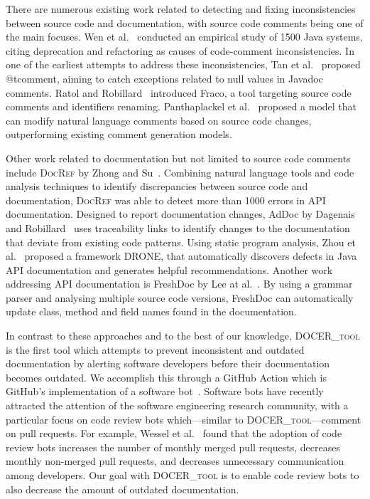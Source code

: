 \documentclass[conference]{IEEEtran}
\newcommand{\tool}{\textsc{DOCER\_tool}}
\begin{document}
There are numerous existing work related to detecting and fixing inconsistencies between source code and documentation, with source code comments being one of the main focuses. Wen et al.~\cite{wen2019large} conducted an empirical study of 1500 Java systems, citing deprecation and refactoring as causes of code-comment inconsistencies. In one of the earliest attempts to address these inconsistencies, Tan et al.~\cite{tan2012tcomment} proposed @tcomment, aiming to catch exceptions related to null values in Javadoc comments. Ratol and Robillard~\cite{ratol2017detecting} introduced Fraco, a tool targeting source code comments and identifiers renaming. Panthaplackel et al.~\cite{panthaplackel2020learning} proposed a model that can modify natural language comments based on source code changes, outperforming existing comment generation models.

Other work related to documentation but not limited to source code comments include \textsc{DocRef} by Zhong and Su~\cite{zhong2013detecting}. Combining natural language tools and code analysis techniques to identify discrepancies between source code and documentation, \textsc{DocRef} was able to detect more than 1000 errors in API documentation. Designed to report documentation changes, AdDoc by Dagenais and Robillard~\cite{dagenais2014using} uses traceability links to identify changes to the documentation that deviate from existing code patterns. Using static program analysis, Zhou et al.~\cite{zhou2018automatic} proposed a framework DRONE, that automatically discovers defects in Java API documentation and generates helpful recommendations. Another work addressing API documentation is FreshDoc by Lee at al.~\cite{lee2019automatic}. By using a grammar parser and analysing multiple source code versions, FreshDoc can automatically update class, method and field names found in the documentation.

In contrast to these approaches and to the best of our knowledge, \tool{} is the first tool which attempts to prevent inconsistent and outdated documentation by alerting software developers before their documentation becomes outdated. We accomplish this through a GitHub Action which is GitHub's implementation of a software bot~\cite{lebeuf2017software}. Software bots have recently attracted the attention of the software engineering research community, with a particular focus on code review bots which---similar to \tool{}---comment on pull requests. For example, Wessel et al.~\cite{wessel2020effects} found that the adoption of code review bots increases the number of monthly merged pull requests, decreases monthly non-merged pull requests, and decreases unnecessary communication among developers. Our goal with \tool{} is to enable code review bots to also decrease the amount of outdated documentation.
\end{document}
